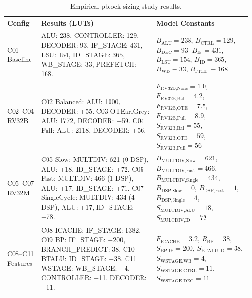 \begin{table}[htbp]
\centering
\caption{Empirical pblock sizing study results.}
\label{tab:pblock_results}
\setlength{\tabcolsep}{3pt}
\scriptsize
\renewcommand{\arraystretch}{1.35}
\begin{tabularx}{\linewidth}{@{}p{1.8cm}X p{4.2cm}@{}}
\toprule
Config & Results (\acp{LUT}) & Model Constants \\
\midrule
C01 \newline Baseline & ALU: 238, CONTROLLER: 129, DECODER: 93, IF\_STAGE: 431, LSU: 154, ID\_STAGE: 365, WB\_STAGE: 33, PREFETCH: 168. & $B_{\text{ALU}} = 238$, $B_{\text{CTRL}} = 129$, $B_{\text{DEC}} = 93$, $B_{\text{IF}} = 431$, $B_{\text{LSU}} = 154$, $B_{\text{ID}} = 365$, $B_{\text{WB}} = 33$, $B_{\text{PREF}} = 168$ \\
\midrule
C02--C04 \newline RV32B & C02 Balanced: ALU: 1000, DECODER: +55. \newline C03 OTEarlGrey: ALU: 1772, DECODER: +59. \newline C04 Full: ALU: 2118, DECODER: +56. & $F_{\text{RV32B,None}} = 1.0$, $F_{\text{RV32B,Bal}} = 4.2$, $F_{\text{RV32B,OTE}} = 7.5$, $F_{\text{RV32B,Full}} = 8.9$, $S_{\text{RV32B,Bal}} = 55$, $S_{\text{RV32B,OTE}} = 59$, $S_{\text{RV32B,Full}} = 56$ \\
\midrule
C05--C07 \newline RV32M & C05 Slow: MULTDIV: 621 (0 DSP), ALU: +18, ID\_STAGE: +72. \newline C06 Fast: MULTDIV: 466 (1 DSP), ALU: +17, ID\_STAGE: +71. \newline C07 SingleCycle: MULTDIV: 434 (4 DSP), ALU: +17, ID\_STAGE: +78. & $B_{\text{MULTDIV,Slow}} = 621$, $B_{\text{MULTDIV,Fast}} = 466$, $B_{\text{MULTDIV,Single}} = 434$, $B_{\text{DSP,Slow}} = 0$, $B_{\text{DSP,Fast}} = 1$, $B_{\text{DSP,Single}} = 4$, $S_{\text{MULTDIV,ALU}} = 18$, $S_{\text{MULTDIV,ID}} = 72$ \\
\midrule
C08--C11 \newline Features & C08 ICACHE: IF\_STAGE: 1382. \newline C09 BP: IF\_STAGE: +200, BRANCH\_PREDICT: 38. \newline C10 BTALU: ID\_STAGE: +38. \newline C11 WSTAGE: WB\_STAGE: +4, CONTROLLER: +11, DECODER: +11. & $F_{\text{ICACHE}} = 3.2$, $B_{\text{BP}} = 38$, $S_{\text{BP,IF}} = 200$, $S_{\text{BTALU,ID}} = 38$, $S_{\text{WSTAGE,WB}} = 4$, $S_{\text{WSTAGE,CTRL}} = 11$, $S_{\text{WSTAGE,DEC}} = 11$ \\

\end{tabularx}
\end{table}
